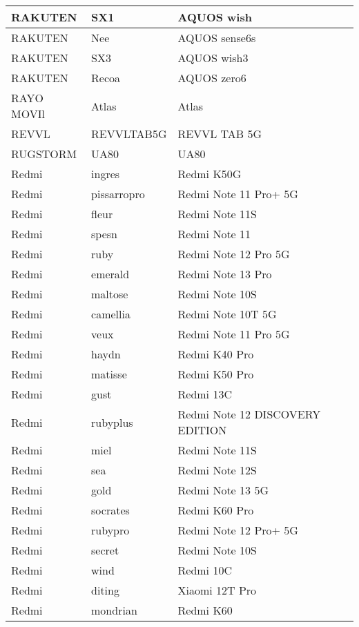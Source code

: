 \begin{tabularx}{\linewidth}{|l|X|X|}
        RAKUTEN & SX1 & AQUOS wish \\ \hline
        RAKUTEN & Nee & AQUOS sense6s \\ \hline
        RAKUTEN & SX3 & AQUOS wish3 \\ \hline
        RAKUTEN & Recoa & AQUOS zero6 \\ \hline
        RAYO MOVIl & Atlas & Atlas \\ \hline
        REVVL & REVVLTAB5G & REVVL TAB 5G \\ \hline
        RUGSTORM & UA80 & UA80 \\ \hline
        Redmi & ingres & Redmi K50G \\ \hline
        Redmi & pissarropro & Redmi Note 11 Pro+ 5G \\ \hline
        Redmi & fleur & Redmi Note 11S \\ \hline
        Redmi & spesn & Redmi Note 11 \\ \hline
        Redmi & ruby & Redmi Note 12 Pro 5G \\ \hline
        Redmi & emerald & Redmi Note 13 Pro \\ \hline
        Redmi & maltose & Redmi Note 10S \\ \hline
        Redmi & camellia & Redmi Note 10T 5G \\ \hline
        Redmi & veux & Redmi Note 11 Pro 5G \\ \hline
        Redmi & haydn & Redmi K40 Pro \\ \hline
        Redmi & matisse & Redmi K50 Pro \\ \hline
        Redmi & gust & Redmi 13C \\ \hline
        Redmi & rubyplus & Redmi Note 12 DISCOVERY EDITION \\ \hline
        Redmi & miel & Redmi Note 11S \\ \hline
        Redmi & sea & Redmi Note 12S \\ \hline
        Redmi & gold & Redmi Note 13 5G \\ \hline
        Redmi & socrates & Redmi K60 Pro \\ \hline
        Redmi & rubypro & Redmi Note 12 Pro+ 5G \\ \hline
        Redmi & secret & Redmi Note 10S \\ \hline
        Redmi & wind & Redmi 10C \\ \hline
        Redmi & diting & Xiaomi 12T Pro \\ \hline
        Redmi & mondrian & Redmi K60 \\ \hline

\end{tabularx}
